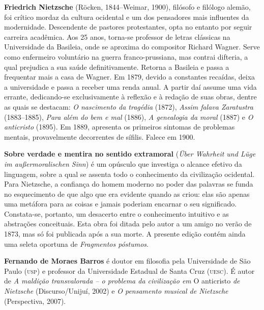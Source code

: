 
\vspace*{7cm}

\noindent\textbf{Friedrich Nietzsche} (Röcken, 1844--Weimar, 1900), filósofo 
e filólogo alemão, foi crítico mordaz da cultura ocidental 
e um dos pensadores mais influentes da modernidade. Descendente de pastores 
protestantes, opta no entanto por seguir carreira acadêmica. 
Aos 25 anos, torna-se professor de letras clássicas na Universidade 
da Basileia, onde se aproxima do compositor Richard Wagner. Serve 
como enfermeiro voluntário na guerra franco-prussiana, mas contrai 
difteria, a qual prejudica a sua saúde definitivamente. Retorna a 
Basileia e passa a frequentar mais a casa de Wagner. Em 
1879, devido a constantes recaídas, deixa a universidade e passa a 
receber uma renda anual. A partir daí assume uma vida errante, 
dedicando-se exclusivamente à reflexão e à redação de suas obras, 
dentre as quais se destacam: \textit{O nascimento da tragédia} (1872), 
\textit{Assim falava Zaratustra} (1883--1885), \textit{Para além do bem e mal} (1886), 
\textit{A genealogia da moral} (1887) e \textit{O anticristo} (1895). Em 1889, 
apresenta os primeiros sintomas de problemas mentais, provavelmente 
decorrentes de sífilis. Falece em 1900.

\noindent\textbf{Sobre verdade e mentira no sentido extramoral} (\textit{Über Wahrheit 
und Lüge im außermoralischen Sinn}) é um opúsculo que investiga 
o alcance efetivo da linguagem, sobre a qual se assenta todo o 
conhecimento da civilização ocidental. Para Nietzsche, a confiança do 
homem moderno no poder das palavras se funda no esquecimento de que 
algo que era evidente quando as criou: elas são apenas uma metáfora 
para as coisas e jamais poderiam encarnar o seu significado. 
Constata-se, portanto, um desacerto entre o conhecimento intuitivo 
e as abstrações conceituais. Esta obra foi ditada pelo autor a um amigo 
no verão de 1873, mas só foi publicada após a sua morte. A presente 
edição contém ainda uma seleta oportuna de \textit{Fragmentos póstumos}.

\noindent\textbf{Fernando de Moraes Barros} é doutor em filosofia pela Universidade 
de São Paulo (\textsc{usp}) e professor da Universidade Estadual de Santa Cruz 
(\textsc{uesc}). É autor de \textit{A maldição transvalorada -- o problema da civilização 
em} O anticristo \textit{de Nietzsche} (Discurso/Unijuí, 2002) 
e \textit{O pensamento musical de Nietzsche} (Perspectiva, 2007).
